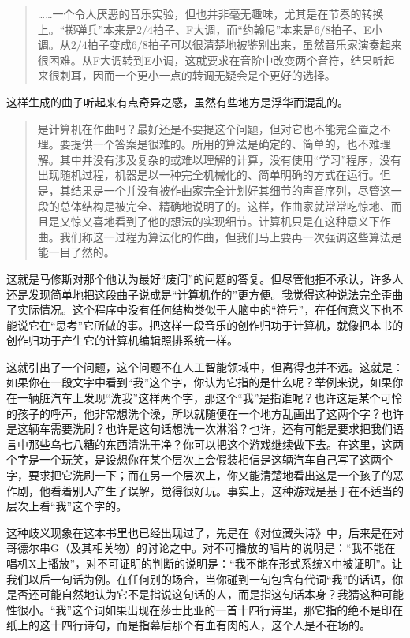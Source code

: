 \begin{quote}
……一个令人厌恶的音乐实验，但也并非毫无趣味，尤其是在节奏的转换上。“掷弹兵”本来是$2/4$拍子、F大调，而“约翰尼”本来是$6/8$拍子、E小调。从$2/4$拍子变成$6/8$拍子可以很清楚地被鉴别出来，虽然音乐家演奏起来很困难。从F大调转到E小调，这就要求在音阶中改变两个音符，结果听起来很刺耳，因而一个更小一点的转调无疑会是个更好的选择。
\end{quote}

这样生成的曲子听起来有点奇异之感，虽然有些地方是浮华而混乱的。

\begin{quote}
是计算机在作曲吗？最好还是不要提这个问题，但对它也不能完全置之不理。要提供一个答案是很难的。所用的算法是确定的、简单的，也不难理解。其中并没有涉及复杂的或难以理解的计算，没有使用“学习”程序，没有出现随机过程，机器是以一种完全机械化的、简单明确的方式在运行。但是，其结果是一个并没有被作曲家完全计划好其细节的声音序列，尽管这一段的总体结构是被完全、精确地说明了的。这样，作曲家就常常吃惊地、而且是又惊又喜地看到了他的想法的实现细节。计算机只是在这种意义下作曲。我们称这一过程为算法化的作曲，但我们马上要再一次强调这些算法是能一目了然的。
\end{quote}

这就是马修斯对那个他认为最好“废问”的问题的答复。但尽管他拒不承认，许多人还是发现简单地把这段曲子说成是“计算机作的”更方便。我觉得这种说法完全歪曲了实际情况。这个程序中没有任何结构类似于人脑中的“符号”，在任何意义下也不能说它在“思考”它所做的事。把这样一段音乐的创作归功于计算机，就像把本书的创作归功于产生它的计算机编辑照排系统一样。

这就引出了一个问题，这个问题不在人工智能领域中，但离得也并不远。这就是：如果你在一段文字中看到“我”这个字，你认为它指的是什么呢？举例来说，如果你在一辆脏汽车上发现“洗我”这样两个字，那这个“我”是指谁呢？也许这是某个可怜的孩子的呼声，他非常想洗个澡，所以就随便在一个地方乱画出了这两个字？也许是这辆车需要洗刷？也许是这句话想洗一次淋浴？也许，还有可能是要求把我们语言中那些乌七八糟的东西清洗干净？你可以把这个游戏继续做下去。在这里，这两个字是一个玩笑，是设想你在某个层次上会假装相信是这辆汽车自己写了这两个字，要求把它洗刷一下；而在另一个层次上，你又能清楚地看出这是一个孩子的恶作剧，他看着别人产生了误解，觉得很好玩。事实上，这种游戏是基于在不适当的层次上看“我”这个字的。

这种歧义现象在这本书里也已经出现过了，先是在《对位藏头诗》中，后来是在对哥德尔串G（及其相关物）的讨论之中。对不可播放的唱片的说明是：“我不能在唱机X上播放”，对不可证明的判断的说明是：“我不能在形式系统X中被证明”。让我们以后一句话为例。在任何别的场合，当你碰到一句包含有代词“我”的话语，你是否还可能自然地认为它不是指说这句话的人，而是指这句话本身？我猜这种可能性很小。“我”这个词如果出现在莎士比亚的一首十四行诗里，那它指的绝不是印在纸上的这十四行诗句，而是指幕后那个有血有肉的人，这个人是不在场的。

